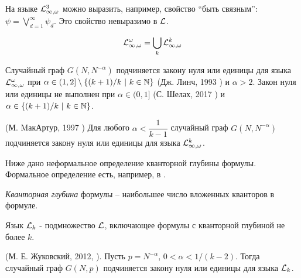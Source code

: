 На языке $\mathcal{L}^3_{\infty, \omega}$ можно выразить, например, свойство ``быть связным'': $\psi = \bigvee_{d=1}^\infty \psi_d$.
Это свойство невыразимо в $\mathcal{L}$.

\Def \[\mathcal{L}^\omega_{\infty, \omega} = \bigcup_k \mathcal{L}^k_{\infty, \omega} \]

\begin{theorem}
Случайный граф $G(N, N^{-\alpha})$ подчиняется закону нуля или единицы для языка $\mathcal{L}^\omega_{\infty, \omega}$ при $\alpha \in (1,2] \setminus \{(k+1)/k ~|~ k \in \mathbb {N} \}$ (Дж. Линч, 1993  \cite{lynch1993infinitary}) и $\alpha > 2$.
Закон нуля или единицы не выполнен при $\alpha \in (0,1]$ (С. Шелах, 2017 \cite{shelah2017failure})  и $\alpha \in \{(k+1)/k ~|~ k \in \mathbb {N} \}$.
\end{theorem}

\begin{theorem} (М. MакАртур, 1997 \cite{mcarthur1997asymptotic})
Для любого $\alpha < \dfrac{1}{k-1}$ случайный граф $G(N, N^{-\alpha})$ подчиняется закону нуля или единицы для языка $\mathcal{L}^k_{\infty, \omega}$.
\end{theorem}

Ниже дано неформальное определение кванторной глубины формулы.
Формальное определение есть, например, в \cite{shen}.

\Def \textit{Кванторная глубина} формулы -- наибольшее число вложенных кванторов в формуле.

\Def Язык $\mathcal{L}_k$ - подмножество $\mathcal{L}$, включающее формулы с кванторной глубиной не более $k$.

\begin{theorem}(М. Е. Жуковский, 2012, \cite{zhukovskii2012zero}). Пусть $p=N^{-\alpha}$, $0 < \alpha < 1/(k - 2)$. 
Тогда случайный граф $G(N, p)$ подчиняется закону нуля или единицы для языка $\mathcal{L}_k$.
\end{theorem}